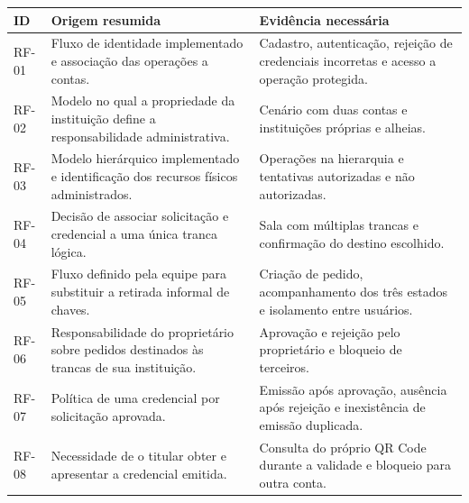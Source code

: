 \begin{quadro}[htb]
    \caption{Rastreabilidade de RF-01 a RF-08: aplicação web e fluxo de autorização}
    \label{qua:rastreabilidade-rf-web}
    \small
    \renewcommand{\arraystretch}{1.12}
    \begin{tabular}{|>{\centering\arraybackslash}p{}|>{\raggedright\arraybackslash}p{}|>{\raggedright\arraybackslash}p{}|}
        \hline
        \textbf{ID} & \textbf{Origem resumida} & \textbf{Evidência necessária} \\ \hline
        RF-01 & Fluxo de identidade implementado e associação das operações a contas. & Cadastro, autenticação, rejeição de credenciais incorretas e acesso a operação protegida. \\ \hline
        RF-02 & Modelo no qual a propriedade da instituição define a responsabilidade administrativa. & Cenário com duas contas e instituições próprias e alheias. \\ \hline
        RF-03 & Modelo hierárquico implementado e identificação dos recursos físicos administrados. & Operações na hierarquia e tentativas autorizadas e não autorizadas. \\ \hline
        RF-04 & Decisão de associar solicitação e credencial a uma única tranca lógica. & Sala com múltiplas trancas e confirmação do destino escolhido. \\ \hline
        RF-05 & Fluxo definido pela equipe para substituir a retirada informal de chaves. & Criação de pedido, acompanhamento dos três estados e isolamento entre usuários. \\ \hline
        RF-06 & Responsabilidade do proprietário sobre pedidos destinados às trancas de sua instituição. & Aprovação e rejeição pelo proprietário e bloqueio de terceiros. \\ \hline
        RF-07 & Política de uma credencial por solicitação aprovada. & Emissão após aprovação, ausência após rejeição e inexistência de emissão duplicada. \\ \hline
        RF-08 & Necessidade de o titular obter e apresentar a credencial emitida. & Consulta do próprio QR Code durante a validade e bloqueio para outra conta. \\ \hline
    \end{tabular}
\end{quadro}

